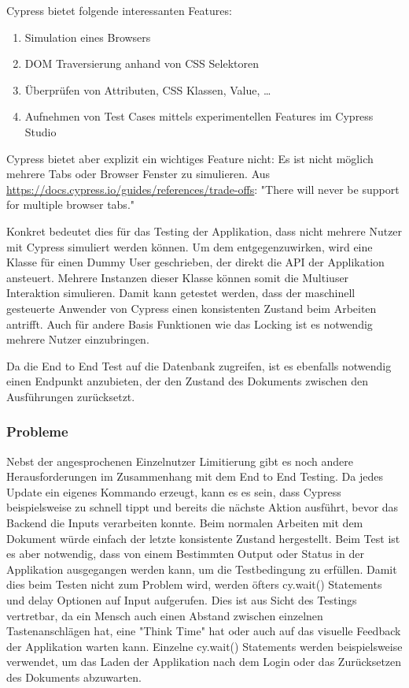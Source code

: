 Cypress bietet folgende interessanten Features:

\begin{enumerate}
    \item Simulation eines Browsers
    \item DOM Traversierung anhand von CSS Selektoren
    \item \"Uberpr\"ufen von Attributen, CSS Klassen, Value, \ldots
    \item Aufnehmen von Test Cases mittels experimentellen Features im Cypress Studio
\end{enumerate}

Cypress bietet aber explizit ein wichtiges Feature nicht: Es ist nicht m\"oglich mehrere Tabs oder Browser Fenster zu simulieren.
Aus \url{https://docs.cypress.io/guides/references/trade-offs}: "There will never be support for multiple browser tabs."

Konkret bedeutet dies f\"ur das Testing der Applikation, dass nicht mehrere Nutzer mit Cypress simuliert werden k\"onnen.
Um dem entgegenzuwirken, wird eine Klasse f\"ur einen Dummy User geschrieben, der direkt die API der Applikation ansteuert.
Mehrere Instanzen dieser Klasse k\"onnen somit die Multiuser Interaktion simulieren.
Damit kann getestet werden, dass der maschinell gesteuerte Anwender von Cypress einen konsistenten Zustand beim Arbeiten antrifft.
Auch f\"ur andere Basis Funktionen wie das Locking ist es notwendig mehrere Nutzer einzubringen.

Da die End to End Test auf die Datenbank zugreifen, ist es ebenfalls notwendig einen Endpunkt anzubieten, der den Zustand des Dokuments zwischen den Ausf\"uhrungen zur\"ucksetzt.

\subsubsection{Probleme}
Nebst der angesprochenen Einzelnutzer Limitierung gibt es noch andere Herausforderungen im Zusammenhang mit dem End to End Testing.
Da jedes Update ein eigenes Kommando erzeugt, kann es es sein, dass Cypress beispielsweise zu schnell tippt und bereits die n\"achste Aktion ausf\"uhrt, bevor das Backend die Inputs verarbeiten konnte.
Beim normalen Arbeiten mit dem Dokument w\"urde einfach der letzte konsistente Zustand hergestellt.
Beim Test ist es aber notwendig, dass von einem Bestimmten Output oder Status in der Applikation ausgegangen werden kann, um die Testbedingung zu erf\"ullen.
Damit dies beim Testen nicht zum Problem wird, werden \"ofters cy.wait() Statements und delay Optionen auf Input aufgerufen.
Dies ist aus Sicht des Testings vertretbar, da ein Mensch auch einen Abstand zwischen einzelnen Tastenanschl\"agen hat, eine "Think Time" hat oder auch auf das visuelle Feedback der Applikation warten kann.
Einzelne cy.wait() Statements werden beispielsweise verwendet, um das Laden der Applikation nach dem Login oder das Zur\"ucksetzen des Dokuments abzuwarten.

